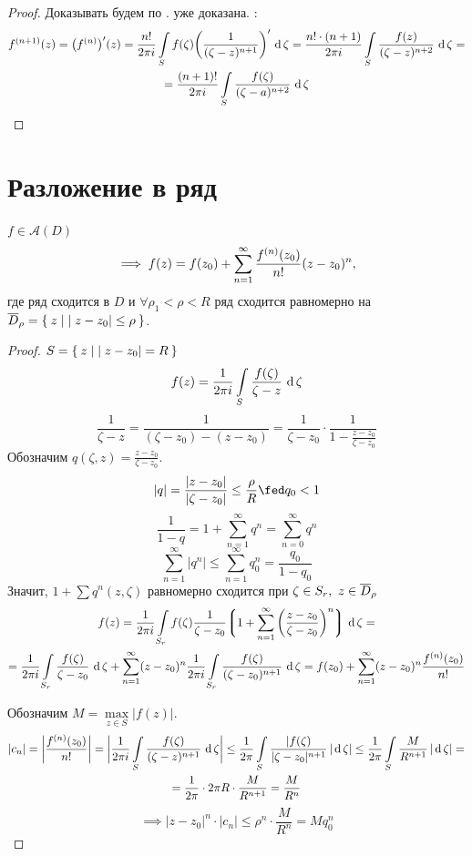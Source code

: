 \begin{proof}
	Доказывать будем по .  уже доказана. :
	\begin{multline*}
		\nder[n + 1]f(z) = \big( \nder f \big)'(z) = \frac{n!}{2\pi i} \cint[\zeta]S{f(\zeta) \bigg( \frac1{(\zeta - z)^{n + 1}} \bigg)'} = \frac{n! \cdot (n + 1)}{2\pi i} \cint[\zeta]S{\frac{f(z)}{(\zeta - z)^{n + 2}}} = \\
		= \frac{(n + 1)!}{2\pi i} \cint[\zeta]S{\frac{f(\zeta)}{(\zeta - a)^{n + 2}}}
	\end{multline*}
\end{proof}

\section{Разложение  в ряд}

\begin{theorem}
	$ f \in \mathcal A(D) $
	$$ \implies f(z) = f(z_0) + \sum_{n = 1}^\infty \frac{\nder f(z_0)}{n!} (z - z_0)^n, $$
	где ряд сходится в $ D $ и $ \forall \rho_1 < \rho < R $ ряд сходится равномерно на $ \ol D_\rho = \set{z \mid |z - z_0| \le \rho} $.
\end{theorem}

\begin{proof}
	$ S = \set{z \mid |z - z_0| = R} $
	$$ f(z) = \frac1{2\pi i} \cint[\zeta]{S}{\frac{f(\zeta)}{\zeta - z}} $$
	$$ \frac1{\zeta - z} = \frac1{(\zeta - z_0) - (z - z_0)} = \frac1{\zeta - z_0} \cdot \frac1{1 - \frac{z - z_0}{\zeta - z_0}} $$
	Обозначим $ q(\zeta, z) = \frac{z - z_0}{\zeta - z_0} $.
	$$ |q| = \frac{|z - z_0|}{|\zeta - z_0|} \le \frac\rho R \fed q_0 < 1 $$
	$$ \frac1{1 - q} = 1 + \sum_{n = 1}^\infty q^n = \sum_{n = 0}^\infty q^n $$
	$$ \sum_{n = 1}^\infty |q^n| \le \sum_{n = 1}^\infty q_0^n = \frac{q_0}{1 - q_0} $$
	Значит, $ 1 + \sum q^n(z, \zeta) $ равномерно сходится при $ \zeta \in S_r, ~ z \in \ol D_\rho $
	\begin{multline*}
		f(z) = \frac1{2\pi i} \cint[\zeta]{S_r}{f(\zeta) \frac1{\zeta - z_0} \bigg\lgroup 1 + \sum_{n = 1}^\infty \bigg( \frac{z - z_0}{\zeta - z_0} \bigg)^n \bigg\rgroup} = \\
		= \frac1{2\pi i} \cint[\zeta]{S_r}{\frac{f(\zeta)}{\zeta - z_0}} + \sum_{n = 1}^\infty (z - z_0)^n \frac1{2\pi i} \cint[\zeta]{S_r}{\frac{f(\zeta)}{(\zeta - z_0)^{n + 1}}} = f(z_0) + \sum_{n = 1}^\infty (z - z_0)^n \frac{\nder f(z_0)}{n!}
	\end{multline*}

	Обозначим $ M = \max\limits_{z \in S}|f(z)| $.
	\begin{multline*}
		|c_n| = \bigg| \frac{\nder f(z_0)}{n!} \bigg| = \bigg| \frac1{2\pi i} \cint[\zeta]{S}{\frac{f(\zeta)}{(\zeta - z)^{n + 1}}} \bigg| \le \frac1{2\pi} \acint[\zeta]{S}{\frac{|f(\zeta)}{|\zeta - z_0|^{n + 1}}} \le \frac1{2\pi} \acint[\zeta]{S}{\frac{M}{R^{n + 1}}} = \\
		= \frac1{2\pi} \cdot 2 \pi R \cdot \frac{M}{R^{n + 1}} = \frac{M}{R^n}
	\end{multline*}
	$$ \implies |z - z_0|^n \cdot |c_n| \le \rho^n \cdot \frac{M}{R^n} = M q_0^n $$
\end{proof}

